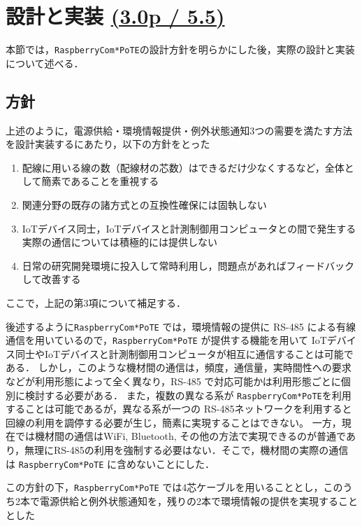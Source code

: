 \section{設計と実装 \small{\underline{(3.0p / 5.5)}}}
\label{sec:04design_and_implementation}

本節では，{\tt Raspberry\-Com*PoTE}の設計方針を明らかにした後，実際の設計と実装について述べる．


\subsection{方針}

上述のように，電源供給・環境情報提供・例外状態通知3つの需要を満たす方法を設計実装するにあたり，以下の方針をとった

\begin{enumerate}
\item 配線に用いる線の数（配線材の芯数）はできるだけ少なくするなど，全体として簡素であることを重視する
\item 関連分野の既存の諸方式との互換性確保には固執しない
\item IoTデバイス同士，IoTデバイスと計測制御用コンピュータとの間で発生する実際の通信については積極的には提供しない
\item 日常の研究開発環境に投入して常時利用し，問題点があればフィードバックして改善する
\end{enumerate}


ここで，上記の第3項について補足する．

後述するように{\tt Raspberry\-Com*PoTE} では，環境情報の提供に RS-485 による有線通信を用いているので，{\tt Raspberry\-Com*PoTE} が提供する機能を用いて IoTデバイス同士やIoTデバイスと計測制御用コンピュータが相互に通信することは可能である．
しかし，このような機材間の通信は，頻度，通信量，実時間性への要求などが利用形態によって全く異なり，RS-485 で対応可能かは利用形態ごとに個別に検討する必要がある．
また，複数の異なる系が {\tt Raspberry\-Com*PoTE}を利用することは可能であるが，異なる系が一つの RS-485ネットワークを利用すると回線の利用を調停する必要が生じ，簡素に実現することはできない。
一方，現在では機材間の通信はWiFi, Bluetooth, その他の方法で実現できるのが普通であり，無理にRS-485の利用を強制する必要はない．そこで，機材間の実際の通信は {\tt Raspberry\-Com*PoTE} に含めないことにした．


この方針の下，{\tt Raspberry\-Com*PoTE} では4芯ケーブルを用いることとし，このうち2本で電源供給と例外状態通知を，残りの2本で環境情報の提供を実現することとした

